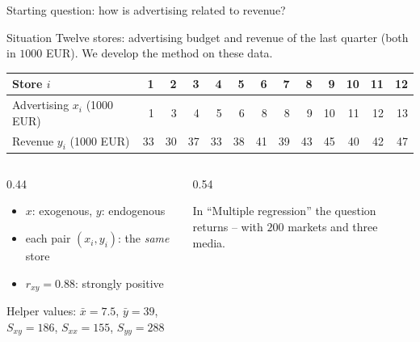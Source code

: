 \documentclass[aspectratio=169,11pt]{beamer}
\begin{document}
\begin{frame}{Starting question: how is advertising related to revenue?}
  \begin{block}{Situation}
    Twelve stores: advertising budget and revenue of the last quarter (both
    in $1000$ EUR). We develop the method on these data.
  \end{block}
  \vspace{-4pt}
  \begin{center}
    \renewcommand{\arraystretch}{1.0}
    \begin{tabular}{l*{12}{r}}
      \toprule
      Store $i$                  & 1  & 2  & 3  & 4  & 5  & 6  & 7  & 8  & 9  & 10 & 11 & 12 \\
      \midrule
      Advertising $x_i$ (1000 EUR) & 1  & 3  & 4  & 5  & 6  & 8  & 8  & 9  & 10 & 11 & 12 & 13 \\
      Revenue $y_i$ (1000 EUR)     & 33 & 30 & 37 & 33 & 38 & 41 & 39 & 43 & 45 & 40 & 42 & 47 \\
      \bottomrule
    \end{tabular}
  \end{center}

  \begin{columns}[T]
    \begin{column}{0.44\textwidth}
      \small
      \begin{itemize}
        \item $x$: exogenous, $y$: endogenous
        \item each pair $(x_i, y_i)$: the \emph{same} store
        \item $r_{xy} = 0.88$: strongly positive
      \end{itemize}
      {\footnotesize Helper values: $\bar{x} = 7.5$, $\bar{y} = 39$,
        $S_{xy} = 186$, $S_{xx} = 155$, $S_{yy} = 288$\par}
    \end{column}
    \begin{column}{0.54\textwidth}
      {\footnotesize In ``Multiple regression'' the question returns -- with
        $200$ markets and three media.\par}
    \end{column}
  \end{columns}
\end{frame}
\end{document}

